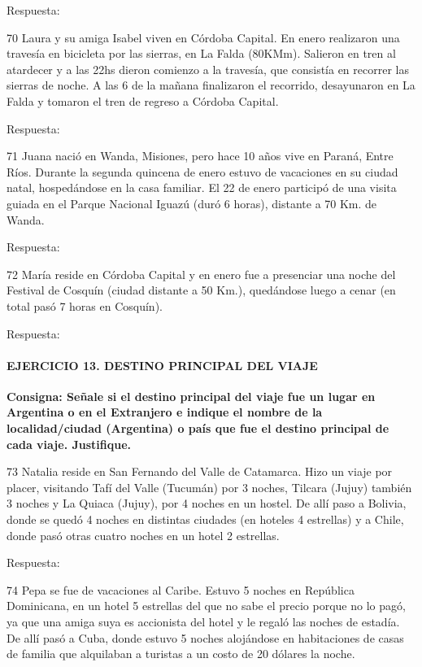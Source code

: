 \documentclass[
  openany]{book}
\begin{document}
Respuesta:

70 Laura y su amiga Isabel viven en Córdoba Capital. En enero realizaron una travesía en bicicleta por las sierras, en La Falda (80KMm). Salieron en tren al atardecer y a las 22hs dieron comienzo a la travesía, que consistía en recorrer las sierras de noche. A las 6 de la mañana finalizaron el recorrido, desayunaron en La Falda y tomaron el tren de regreso a Córdoba Capital.

Respuesta:

71 Juana nació en Wanda, Misiones, pero hace 10 años vive en Paraná, Entre Ríos. Durante la segunda quincena de enero estuvo de vacaciones en su ciudad natal, hospedándose en la casa familiar. El 22 de enero participó de una visita guiada en el Parque Nacional Iguazú (duró 6 horas), distante a 70 Km. de Wanda.

Respuesta:

72 María reside en Córdoba Capital y en enero fue a presenciar una noche del Festival de Cosquín (ciudad distante a 50 Km.), quedándose luego a cenar (en total pasó 7 horas en Cosquín).

Respuesta:

\hypertarget{ejercicio-13.-destino-principal-del-viaje}{%
\paragraph{\texorpdfstring{\textbf{EJERCICIO 13. DESTINO PRINCIPAL DEL VIAJE}}{EJERCICIO 13. DESTINO PRINCIPAL DEL VIAJE}}\label{ejercicio-13.-destino-principal-del-viaje}}

\textbf{Consigna: Señale si el destino principal del viaje fue un lugar en Argentina o en el Extranjero e indique el nombre de la localidad/ciudad (Argentina) o país que fue el destino principal de cada viaje. Justifique.}

73 Natalia reside en San Fernando del Valle de Catamarca. Hizo un viaje por placer, visitando Tafí del Valle (Tucumán) por 3 noches, Tilcara (Jujuy) también 3 noches y La Quiaca (Jujuy), por 4 noches en un hostel. De allí paso a Bolivia, donde se quedó 4 noches en distintas ciudades (en hoteles 4 estrellas) y a Chile, donde pasó otras cuatro noches en un hotel 2 estrellas.

Respuesta:

74 Pepa se fue de vacaciones al Caribe. Estuvo 5 noches en República Dominicana, en un hotel 5 estrellas del que no sabe el precio porque no lo pagó, ya que una amiga suya es accionista del hotel y le regaló las noches de estadía. De allí pasó a Cuba, donde estuvo 5 noches alojándose en habitaciones de casas de familia que alquilaban a turistas a un costo de 20 dólares la noche.
\end{document}
